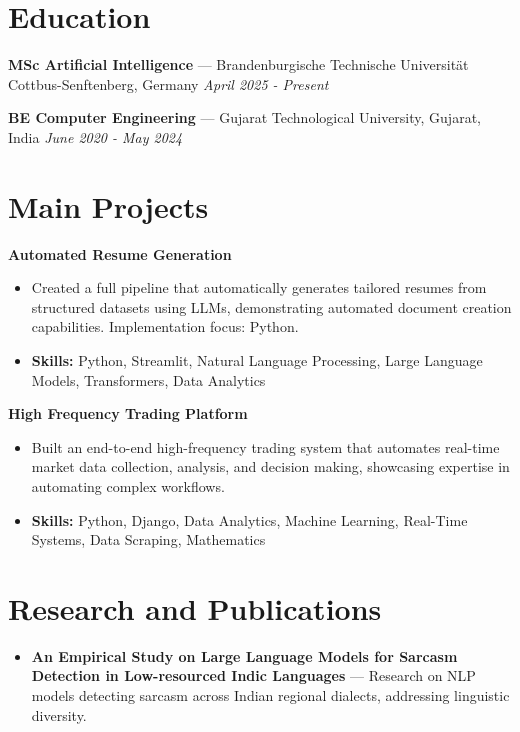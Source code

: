 \documentclass[a4paper,10pt]{article}
\begin{document}
\section*{Education}
\textbf{MSc Artificial Intelligence} — Brandenburgische Technische Universität Cottbus-Senftenberg, Germany \hfill \textit{April 2025 - Present}\par
\vspace{1.5pt}
\textbf{BE Computer Engineering} — Gujarat Technological University, Gujarat, India \hfill \textit{June 2020 - May 2024}\par

\section*{Main Projects}
\textbf{Automated Resume Generation}\par
\vspace{1pt}
\begin{itemize}
  \item Created a full pipeline that automatically generates tailored resumes from structured datasets using LLMs, demonstrating automated document creation capabilities. Implementation focus: Python.
  \item \textbf{Skills:} Python, Streamlit, Natural Language Processing, Large Language Models, Transformers, Data Analytics
\end{itemize}
\vspace{3pt}
\textbf{High Frequency Trading Platform}\par
\vspace{1pt}
\begin{itemize}
  \item Built an end-to-end high-frequency trading system that automates real-time market data collection, analysis, and decision making, showcasing expertise in automating complex workflows.
  \item \textbf{Skills:} Python, Django, Data Analytics, Machine Learning, Real-Time Systems, Data Scraping, Mathematics
\end{itemize}

\section*{Research and Publications}
\begin{itemize}
\item \textbf{An Empirical Study on Large Language Models for Sarcasm Detection in Low-resourced Indic Languages} — Research on NLP models detecting sarcasm across Indian regional dialects, addressing linguistic diversity.
\end{itemize}
\end{document}

